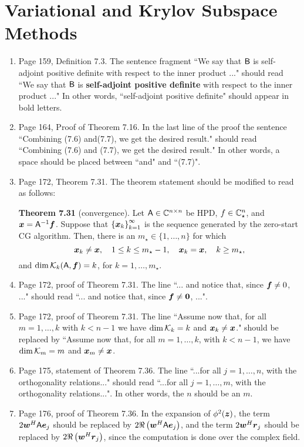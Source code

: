 \documentclass{book}
\begin{document}
	\chapter{Variational and Krylov Subspace Methods}
	
	\begin{enumerate}
	\item
Page 159, Definition 7.3. The sentence fragment ``We say that $\mathsf{B}$ is self-adjoint positive definite with respect to the inner product ..." should read ``We say that $\mathsf{B}$ is \textbf{self-adjoint positive definite} with respect to the inner product ..." In other words, ``self-adjoint positive definite" should appear in bold letters.

	\item
Page 164, Proof of Theorem 7.16. In the last line of the proof the sentence ``Combining (7.6) and(7.7), we get the desired result." should read ``Combining (7.6) and (7.7), we get the desired result." In other words, a space should be placed between ``and" and ``(7.7)".

	\item
Page 172, Theorem 7.31. The theorem statement should be modified to read as follows:

\textbf{Theorem 7.31} (convergence). Let $\mathsf{A}\in\mathbb C^{n\times n}$ be HPD, $f\in \mathbb C^n_\star$, and $\boldsymbol{x} = \mathsf{A}^{-1}\boldsymbol{f}$. Suppose that $\left\{ \boldsymbol{x}_k \right\}_{k = 1}^\infty$ is the sequence generated by the zero-start CG algorithm. Then, there is an $m_\star\in\{1,\ldots , n\}$ for which
	\[
\boldsymbol{x}_k\ne \boldsymbol{x}, \quad 1\le k \le m_\star-1, \quad \boldsymbol{x}_k = \boldsymbol{x}, \quad k\ge m_\star,
	\] 
and $\dim {\mathcal K}_k(\mathsf{A},\boldsymbol{f}) = k$, for $k = 1, \ldots, m_\star$.

	\item
Page 172, proof of Theorem 7.31. The line ``... and notice that, since $\boldsymbol{f}\ne 0$, ..." should read ``... and notice that, since $\boldsymbol{f}\ne {\bf 0}$, ...".

	\item
Page 172, proof of Theorem 7.31. The line ``Assume now that, for all $m = 1, \ldots, k$ with $k < n-1$ we have $\dim {\mathcal K}_k = k$ and $\boldsymbol{x}_k \neq \boldsymbol{x}$." should be replaced by ``Assume now that, for all $m = 1, \ldots, k$, with $k < n-1$, we have $\dim {\mathcal K}_m = m$ and $\boldsymbol{x}_m \neq \boldsymbol{x}$.

	\item
Page 175, statement of Theorem 7.36. The line ``...for all $j = 1, \ldots, n$, with the orthogonality relations..." should read ``...for all $j = 1, \ldots, m$, with the orthogonality relations...". In other words, the $n$ should be an $m$.


	\item
Page 176, proof of Theorem 7.36. In the expansion of $\phi^2(\boldsymbol{z})$, the term $2\boldsymbol{w}^H\mathsf{A}\boldsymbol{e}_j$ should be replaced by $2\Re\left(\boldsymbol{w}^H\mathsf{A}\boldsymbol{e}_j\right)$, and the term $2\boldsymbol{w}^H\boldsymbol{r}_j$ should be replaced by $2\Re\left(\boldsymbol{w}^H\boldsymbol{r}_j\right)$, since the computation is done over the complex field.


	\end{enumerate}
	
\end{document}
